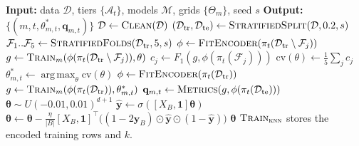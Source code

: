 \documentclass[sigconf,nonacm]{acmart}
\newcommand{\Dtr}{\mathcal{D}_{\mathrm{tr}}}
\newcommand{\Dte}{\mathcal{D}_{\mathrm{te}}}
\DeclareMathOperator*{\argmax}{arg\,max}
\begin{document}
\begin{algorithm}[t]
\caption{PRISM: tiered training and evaluation}\label{alg:prism}
\begin{algorithmic}[1]
\Statex\textbf{Input:} data $\mathcal{D}$, tiers $\{\mathcal{A}_t\}$, models $\mathcal{M}$, grids $\{\Theta_m\}$, seed $s$
\Statex\textbf{Output:} $\{(m,t,\theta^*_{m,t},\mathbf{q}_{m,t})\}$
\State $\mathcal{D}\gets\textsc{Clean}(\mathcal{D})$
\State $(\Dtr,\Dte)\gets\textsc{StratifiedSplit}(\mathcal{D},0.2,s)$
\State $\mathcal{F}_1..\mathcal{F}_5\gets\textsc{StratifiedFolds}(\Dtr,5,s)$
      \State $\phi\gets\textsc{FitEncoder}(\pi_t(\Dtr\setminus\mathcal{F}_j))$
      \State $g\gets\textsc{Train}_m(\phi(\pi_t(\Dtr\setminus\mathcal{F}_j)),\theta)$
      \State $c_j\gets F_1(g,\phi(\pi_t(\mathcal{F}_j)))$
    \EndFor
    \State $\mathrm{cv}(\theta)\gets\frac{1}{5}\sum_j c_j$
  \EndFor
  \State $\theta^*_{m,t}\gets\argmax_\theta\mathrm{cv}(\theta)$ 
  \State $\phi\gets\textsc{FitEncoder}(\pi_t(\Dtr))$
  \State $g\gets\textsc{Train}_m(\phi(\pi_t(\Dtr)),\theta^*_{m,t})$
  \State $\mathbf{q}_{m,t}\gets\textsc{Metrics}(g,\phi(\pi_t(\Dte)))$
\EndFor
{}
  \State $\boldsymbol\theta\sim U(-0.01,0.01)^{d+1}$
      \State $\hat{\mathbf{y}}\gets\sigma([X_B,\mathbf{1}]\boldsymbol\theta)$
      \State $\boldsymbol\theta\gets\boldsymbol\theta-\frac{\eta}{|B|}[X_B,\mathbf{1}]^{\top}\big((1-2\mathbf{y}_B)\odot\hat{\mathbf{y}}\odot(1-\hat{\mathbf{y}})\big)$
    \EndFor
  \EndFor
  \State \Return $\boldsymbol\theta$
\EndProcedure
\Statex $\textsc{Train}_{\textsc{knn}}$ stores the encoded training rows and $k$.
\end{algorithmic}
\end{algorithm}
\end{document}
